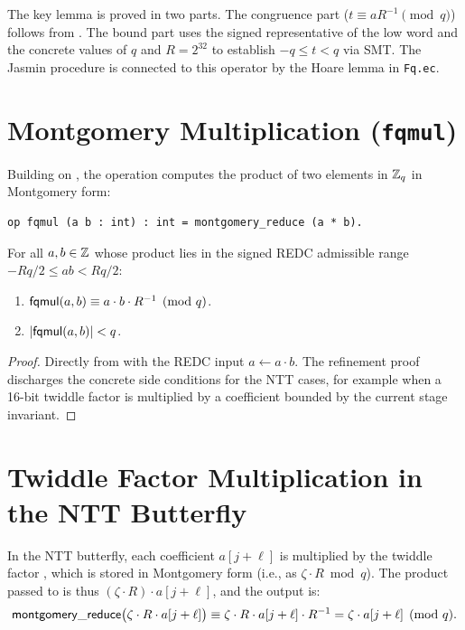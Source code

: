The key lemma  is proved in two parts.  The
congruence part ($t \equiv a R^{-1} \pmod q$) follows from
.  The bound part uses the signed representative of the
low word and the concrete values of $q$ and $R = 2^{32}$ to establish
$-q \le t < q$ via SMT.  The Jasmin procedure is connected to this operator
by the Hoare lemma  in \texttt{Fq.ec}.

\section{Montgomery Multiplication (\texttt{fqmul})}

Building on , the  operation computes the
product of two elements in $\mathbb{Z}_q$ in Montgomery form:

\begin{lstlisting}[language=EasyCrypt,
  caption={\texttt{fqmul} specification},
  label={lst:fqmul}]
op fqmul (a b : int) : int = montgomery_reduce (a * b).
\end{lstlisting}

\begin{theorem}
  For all $a, b \in \mathbb{Z}$ whose product lies in the signed REDC admissible
  range $-Rq/2 \le ab < Rq/2$:
  \begin{enumerate}
    \item $\mathsf{fqmul}(a, b) \equiv a \cdot b \cdot R^{-1} \pmod{q}$.
    \item $|\mathsf{fqmul}(a, b)| < q$.
  \end{enumerate}
\label{thm:fqmul}
\end{theorem}

\begin{proof}
  Directly from  with the REDC input
  $a \leftarrow a \cdot b$.  The refinement proof discharges the concrete
  side conditions for the NTT cases, for example when a 16-bit twiddle factor
  is multiplied by a coefficient bounded by the current stage invariant.
\end{proof}

\section{Twiddle Factor Multiplication in the NTT Butterfly}

In the NTT butterfly, each coefficient $a[j + \ell]$ is multiplied by the
twiddle factor , which is stored in Montgomery form
(i.e., as $\zeta \cdot R \bmod q$).  The product passed to 
is thus $(\zeta \cdot R) \cdot a[j+\ell]$, and the output is:
\[
  \mathsf{montgomery\_reduce}\bigl(\zeta \cdot R \cdot a[j+\ell]\bigr)
  \equiv \zeta \cdot R \cdot a[j+\ell] \cdot R^{-1} = \zeta \cdot a[j+\ell] \pmod{q}.
\]


